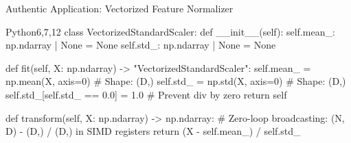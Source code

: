\begin{frame}[fragile]{Authentic Application: Vectorized Feature Normalizer}
  \begin{HighlightedCodeBlock}{Python}{6,7,12}
class VectorizedStandardScaler:
    def __init__(self):
        self.mean_: np.ndarray | None = None
        self.std_:  np.ndarray | None = None

    def fit(self, X: np.ndarray) -> "VectorizedStandardScaler":
        self.mean_ = np.mean(X, axis=0) # Shape: (D,)
        self.std_  = np.std(X, axis=0)  # Shape: (D,)
        self.std_[self.std_ == 0.0] = 1.0 # Prevent div by zero
        return self

    def transform(self, X: np.ndarray) -> np.ndarray:
        # Zero-loop broadcasting: (N, D) - (D,) / (D,) in SIMD registers
        return (X - self.mean_) / self.std_
  \end{HighlightedCodeBlock}
  \vfill
\end{frame}

